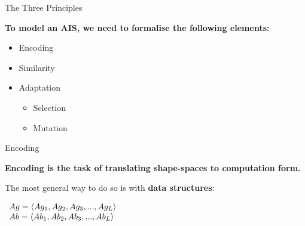 \documentclass[xcolor=svgnames]{beamer}
\begin{document}
        \begin{frame}{The Three Principles}

            \textbf{To model an AIS, we need to formalise the following elements:}

            \begin{itemize}
                \item Encoding
                \item Similarity
                \item Adaptation
                \begin{itemize}
                    \item Selection
                    \item Mutation
                \end{itemize}
            \end{itemize}
        \end{frame}

        \begin{frame}{Encoding}
            
            \textbf{Encoding is the task of translating shape-spaces to computation form.}
            
            \vspace{1em}
            The most general way to do so is with \textbf{data structures}:
            
            \vspace{0.5em}
            
            \begin{center}
                $\begin{array}{ll}
                    Ag = \langle Ag_1,Ag_2,Ag_3,...,Ag_L \rangle \cr
                    Ab = \langle Ab_1,Ab_2,Ab_3,...,Ab_L \rangle \cr
                 \end{array}$
            \end{center}            
        \end{frame}
        
\end{document}
